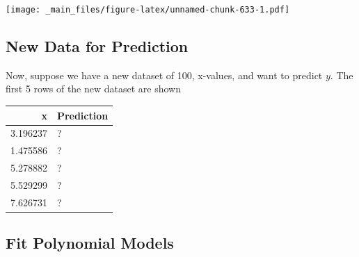 \documentclass[]{book}
\begin{document}
\texttt{[image: \_main\_files/figure-latex/unnamed-chunk-633-1.pdf]}

\subsection{New Data for Prediction}\label{new-data-for-prediction}

Now, suppose we have a new dataset of 100, x-values, and want to predict
\(y\). The first 5 rows of the new dataset are shown

\begin{tabular}{r|l}
\hline
x & Prediction\\
\hline
3.196237 & ?\\
\hline
1.475586 & ?\\
\hline
5.278882 & ?\\
\hline
5.529299 & ?\\
\hline
7.626731 & ?\\
\hline
\end{tabular}

\subsection{Fit Polynomial Models}\label{fit-polynomial-models}
\end{document}
